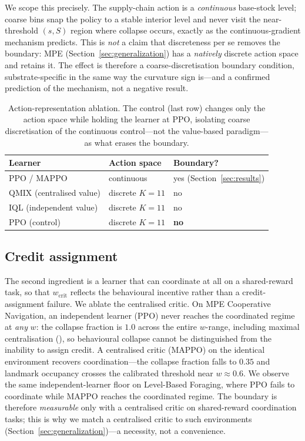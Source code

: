 \documentclass[letterpaper]{article}
\theoremstyle{plain}
\newcommand{\wcrit}{w_{\mathrm{crit}}}
\begin{document}
We scope this precisely. The supply-chain action is a \emph{continuous}
base-stock level; coarse bins snap the policy to a stable interior level and
never visit the near-threshold $(s,S)$ region where collapse occurs, exactly as
the continuous-gradient mechanism predicts. This is \emph{not} a claim that
discreteness per se removes the boundary: MPE (Section~\ref{sec:generalization}) has a
\emph{natively} discrete action space and retains it. The effect is therefore a
coarse-discretisation boundary condition, substrate-specific in the same way the
curvature sign is---and a confirmed prediction of the mechanism, not a negative
result.

\begin{table}[t]
\centering \small
\begin{tabular}{lll}
\toprule
Learner & Action space & Boundary? \\
\midrule
PPO / MAPPO              & continuous        & yes (Section~\ref{sec:results}) \\
QMIX (centralised value) & discrete $K{=}11$ & no \\
IQL (independent value)  & discrete $K{=}11$ & no \\
PPO (control)            & discrete $K{=}11$ & \textbf{no} \\
\bottomrule
\end{tabular}
\caption{Action-representation ablation. The control (last row) changes only the
action space while holding the learner at PPO, isolating coarse discretisation of
the continuous control---not the value-based paradigm---as what erases the
boundary.}
\label{tab:ablation_action}
\end{table}

\subsection{Credit assignment}
\label{sec:ablation_credit}
The second ingredient is a learner that can coordinate at all on a shared-reward
task, so that $\wcrit$ reflects the behavioural incentive rather than a
credit-assignment failure. We ablate the centralised critic. On MPE Cooperative
Navigation, an independent learner (PPO) never reaches the coordinated regime at
\emph{any} $w$: the collapse fraction is $1.0$ across the entire $w$-range,
including maximal centralisation (), so behavioural collapse
cannot be distinguished from the inability to assign credit. A centralised critic
(MAPPO) on the identical environment recovers coordination---the collapse
fraction falls to $0.35$ and landmark occupancy crosses the calibrated threshold
near $w{\approx}0.6$. We observe the same independent-learner floor on
Level-Based Foraging, where PPO fails to coordinate while MAPPO reaches the
coordinated regime. The boundary is therefore \emph{measurable} only with a
centralised critic on shared-reward coordination tasks; this is why we match a
centralised critic to such environments (Section~\ref{sec:generalization})---a
necessity, not a convenience.
\end{document}
